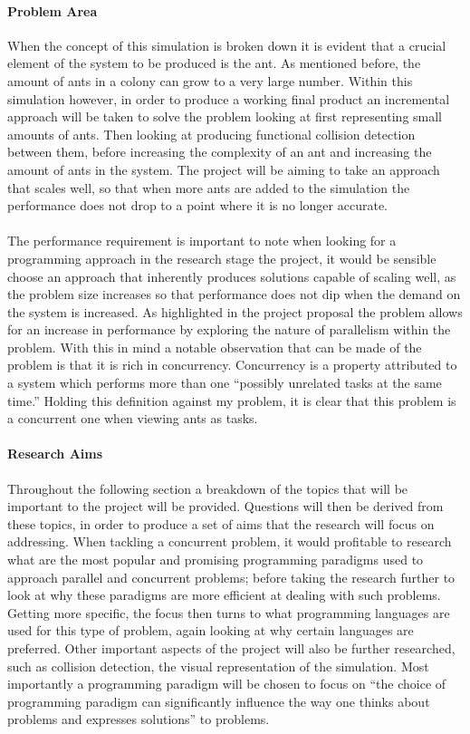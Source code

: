 \documentclass[main.tex]{subfiles}
\begin{document}
\paragraph{Problem Area}
When the concept of this simulation is broken down it is evident that a crucial element of the system to be produced is the ant. As mentioned before, the amount of ants in a colony can grow to a very large number. Within this simulation however, in order to produce a working final product an incremental approach will be taken to solve the problem looking at first representing small amounts of ants. Then looking at producing functional collision detection between them, before increasing the complexity of an ant and increasing the amount of ants in the system. The project will be aiming to take an approach that scales well, so that when more ants are added to the simulation the performance does not drop to a point where it is no longer accurate.

\paragraph{}The performance requirement is important to note when looking for a programming approach in the research stage the project, it would be sensible choose an approach that inherently produces solutions capable of scaling well, as the problem size increases so that performance does not dip when the demand on the system is increased. As highlighted in the project proposal the problem allows for an increase in performance by exploring the nature of parallelism within the problem. With this in mind a notable observation that can be made of the problem is that it is rich in concurrency. Concurrency is a property attributed to a system which performs more than one ``possibly unrelated tasks at the same time.''\cite{OSullivan2008} Holding this definition against my problem, it is clear that this problem is a concurrent one when viewing ants as tasks.

\paragraph{Research Aims}Throughout the following section a breakdown of the topics that will be important to the project will be provided. Questions will then be derived from these topics, in order to produce a set of aims that the research will focus on addressing. When tackling a concurrent problem, it would profitable to research what are the most popular and promising programming paradigms used to approach parallel and concurrent problems; before taking the research further to look at why these paradigms are more efficient at dealing with such problems. Getting more specific, the focus then turns to what programming languages are used for this type of problem, again looking at why certain languages are preferred. Other important aspects of the project will also be further researched, such as collision detection, the visual representation of the simulation. Most importantly a programming paradigm will be chosen to focus on ``the choice of programming paradigm can significantly influence the way one thinks about problems and expresses solutions'' to problems. \cite{Curriculum2008}
\end{document}
